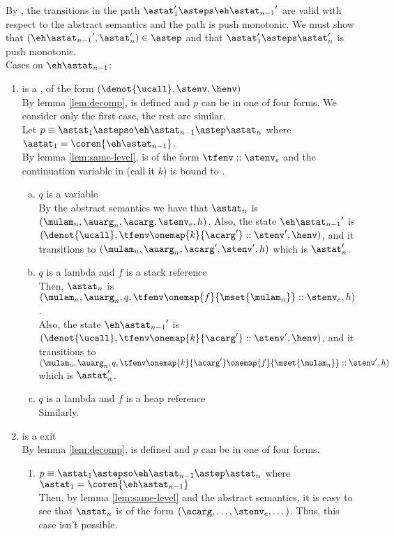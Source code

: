 \documentclass{LMCS}
\theoremstyle{definition} \newtheorem{property}[thm]{Property}
\begin{document}
By \ih, the transitions in the path $\astat_1' \asteps \astatnmo'$ 
are valid with respect to the abstract semantics and the path is push monotonic.
We must show that $(\astatnmo', \astat_n') \in \astep$ and that
$\astat_1' \asteps \astat_n'$ is push monotonic. \\
Cases on $\astatnmo$:
\begin{enumerate}[(1)]
\item \label{lem:stack-irrel,case:ueval}
  \astatnmo{} is a \daueval{}, of the form $(\denot{\ucall}, \stenv, \henv)$ \\
  By lemma \ref{lem:decomp}, \coren{\astatnmo} is defined and $p$ can be in 
  one of four forms.
  We consider only the first case, the rest are similar. \\
  Let $p \equiv \astat_1 \astepso \astatnmo \astep \astat_n$ 
  where $\astat_1 = \coren{\astatnmo}$. \\
  By lemma \ref{lem:same-level}, \stenv{} is of the form
  $\tfenv::\stenv_e$ and the continuation variable in \tfenv{} (call it $k$)
  is bound to \acarg.
  \begin{enumerate}[(a)]
  \item 
    $q$ is a variable \\
    By the abstract semantics we have that
    $\astat_n$ is $(\mulam_n, \auarg_n, \acarg, \stenv_e, h)$.
    Also, the state $\astatnmo'$ is 
    $(\denot{\ucall}, \tfenv\onemap{k}{\acarg'}::\stenv', \henv)$,
    and it transitions to
    $(\mulam_n, \auarg_n, \acarg', \stenv', h)$ which is $\astat_n'$.
  \item
    $q$ is a lambda and $f$ is a stack reference \\
    Then, $\astat_n$ is 
    $(\mulam_n, \auarg_n, q, \tfenv\onemap{f}{\mset{\mulam_n}}::\stenv_e, h)$.\\
    Also, the state $\astatnmo'$ is 
    $(\denot{\ucall}, \tfenv\onemap{k}{\acarg'}::\stenv', \henv)$,
    and it transitions to \\
    $(\mulam_n, \auarg_n, q, \tfenv\onemap{k}{\acarg'}\onemap{f}{\mset{\mulam_n}}::\stenv', h)$ 
    which is $\astat_n'$.
  \item
    $q$ is a lambda and $f$ is a heap reference \\
    Similarly.
  \end{enumerate}
\item
  \astatnmo{} is a \daceval{} exit \\
  By lemma \ref{lem:decomp}, \coren{\astatnmo} is defined and $p$ can be in 
  one of four forms.
  \begin{enumerate}
  \item 
    $p \equiv \astat_1 \astepso \astatnmo \astep \astat_n$ where
    $\astat_1 = \coren{\astatnmo}$ \\
    Then, by lemma \ref{lem:same-level} and the abstract semantics,
    it is easy to see that $\astat_n$ is of the form
    $(\acarg, \dots, \stenv_e, \dots)$.
    Thus, this case isn't possible.


\end{enumerate}
\end{enumerate}
\end{document}
